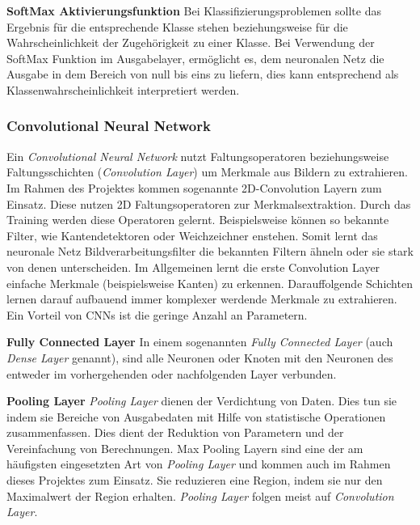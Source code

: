 \documentclass[11pt]{article}
\begin{document}
\textbf{SoftMax Aktivierungsfunktion}\newline
Bei Klassifizierungsproblemen sollte das Ergebnis für die entsprechende Klasse stehen beziehungsweise für die Wahrscheinlichkeit der Zugehörigkeit zu einer Klasse. Bei Verwendung der SoftMax Funktion im Ausgabelayer, ermöglicht es, dem neuronalen Netz die Ausgabe in dem Bereich von null bis eins zu liefern, dies kann entsprechend als Klassenwahrscheinlichkeit interpretiert werden.\parencite{AndreasLindholmNiklasWahlstromFredrikLindsten2019}

\subsubsection{Convolutional Neural Network}
Ein \textit{Convolutional Neural Network} nutzt Faltungsoperatoren beziehungsweise Faltungsschichten (\textit{Convolution Layer}) um Merkmale aus Bildern zu extrahieren. Im Rahmen des Projektes kommen sogenannte 2D-Convolution Layern zum Einsatz. Diese nutzen 2D Faltungsoperatoren zur Merkmalsextraktion. Durch das Training werden diese Operatoren gelernt. Beispielsweise können so bekannte Filter, wie Kantendetektoren oder Weichzeichner enstehen. Somit lernt das neuronale Netz Bildverarbeitungsfilter die bekannten Filtern ähneln oder sie stark von denen unterscheiden. Im Allgemeinen lernt die erste Convolution Layer einfache Merkmale (beispielsweise Kanten) zu erkennen. Darauffolgende Schichten lernen darauf aufbauend immer komplexer werdende Merkmale zu extrahieren. Ein Vorteil von CNNs ist die geringe Anzahl an Parametern.\parencite{Pattanayak2017}

\textbf{Fully Connected Layer}\newline
In einem sogenannten \textit{Fully Connected Layer} (auch \textit{Dense Layer} genannt), sind alle Neuronen oder Knoten mit den Neuronen des entweder im vorhergehenden oder nachfolgenden Layer verbunden.\parencite{Pattanayak2017}

\textbf{Pooling Layer}\newline
\textit{Pooling Layer} dienen der Verdichtung von Daten. Dies tun sie indem sie Bereiche von Ausgabedaten mit Hilfe von statistische Operationen zusammenfassen. Dies dient der Reduktion von Parametern und der Vereinfachung von Berechnungen.  Max Pooling Layern sind eine der am häufigsten eingesetzten Art von \textit{Pooling Layer} und kommen auch im Rahmen dieses Projektes zum Einsatz. Sie reduzieren eine Region, indem sie nur den Maximalwert der Region erhalten. \textit{Pooling Layer} folgen meist auf \textit{Convolution Layer}.\parencite{Karpathy}\parencite{IanGoodfellowYoshuaBengio2016}
\pagebreak
\end{document}
